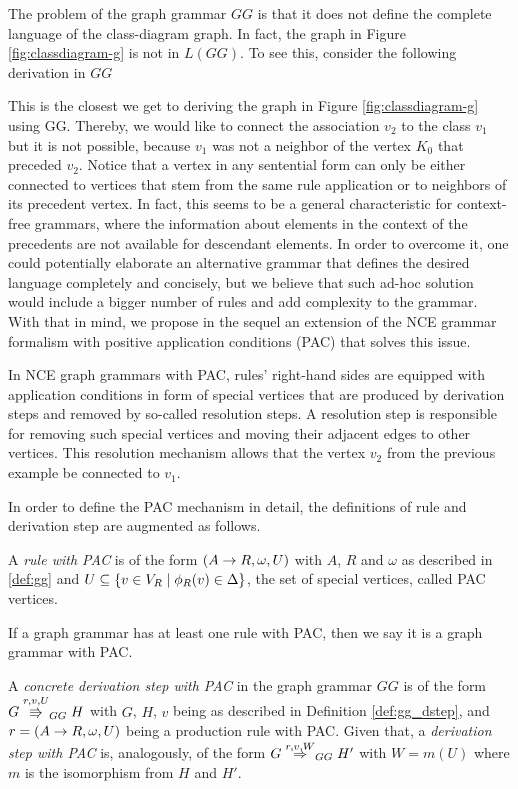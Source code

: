 The problem of the graph grammar $GG$ is that it does not define the complete language of the class-diagram graph. In fact, the graph in Figure \ref{fig:classdiagram-g} is not in $L(GG)$. To see this, consider the following derivation in $GG$



This is the closest we get to deriving the graph in Figure \ref{fig:classdiagram-g} using GG. Thereby, we would like to connect the association $v_2$ to the class $v_1$ but it is not possible, because $v_1$ was not a neighbor of the vertex $K_0$ that preceded $v_2$. Notice that a vertex in any sentential form can only be either connected to vertices that stem from the same rule application or to neighbors of its precedent vertex. In fact, this seems to be a general characteristic for context-free grammars, where the information about elements in the context of the precedents are not available for descendant elements. In order to overcome it, one could potentially elaborate an alternative grammar that defines the desired language completely and concisely, but we believe that such ad-hoc solution would include a bigger number of rules and add complexity to the grammar. With that in mind, we propose in the sequel an extension of the NCE grammar formalism with positive application conditions (PAC) that solves this issue. 

In NCE graph grammars with PAC, rules' right-hand sides are equipped with application conditions in form of special vertices that are produced by derivation steps and removed by so-called resolution steps. A resolution step is responsible for removing such special vertices and moving their adjacent edges to other vertices. This resolution mechanism allows that the vertex $v_2$ from the previous example be connected to $v_1$. 

In order to define the PAC mechanism in detail, the definitions of rule and derivation step are augmented as follows.

\begin{definition}
	A \emph{rule with PAC} is of the form $(A \to R, \omega, U)$ with $A$, $R$ and $\omega$ as described in \ref{def:gg} and $U \subseteq \{v \in V_R \; | \; \phi_R(v) \in \Delta\}$, the set of special vertices, called PAC vertices.
\end{definition}

If a graph grammar has at least one rule with PAC, then we say it is a graph grammar with PAC.

\begin{definition}
	A \textit{concrete derivation step with PAC} in the graph grammar $GG$ is of the form $G \overset{r,v,U}{\Rrightarrow}_{GG} H$ with $G$, $H$, $v$ being as described in Definition \ref{def:gg_dstep}, and $r = (A \to R, \omega, U)$ being a production rule with PAC. Given that, a \textit{derivation step with PAC} is, analogously, of the form $G \derivpac{r}{v}{W}{GG} H'$ with $W = m(U)$ where $m$ is the isomorphism from $H$ and $H'$.
\end{definition}

